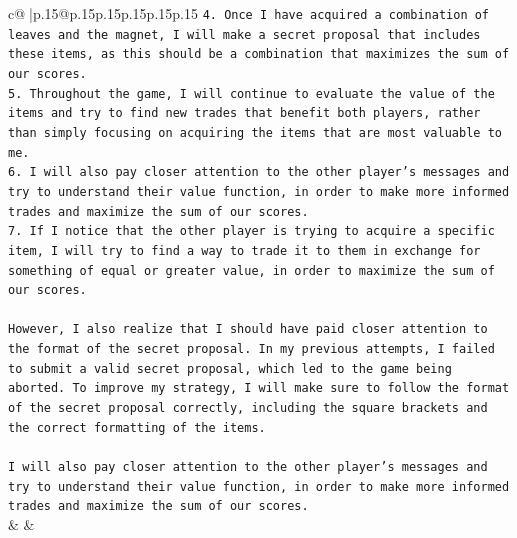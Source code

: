 \documentclass{article}
\begin{document}
{\begin{supertabular}{c@{$\;$}|p{.15\linewidth}@{}p{.15\linewidth}p{.15\linewidth}p{.15\linewidth}p{.15\linewidth}p{.15\linewidth}}
{{{\texttt{4. Once I have acquired a combination of leaves and the magnet, I will make a secret proposal that includes these items, as this should be a combination that maximizes the sum of our scores.} \\
\texttt{5. Throughout the game, I will continue to evaluate the value of the items and try to find new trades that benefit both players, rather than simply focusing on acquiring the items that are most valuable to me.} \\
\texttt{6. I will also pay closer attention to the other player's messages and try to understand their value function, in order to make more informed trades and maximize the sum of our scores.} \\
\texttt{7. If I notice that the other player is trying to acquire a specific item, I will try to find a way to trade it to them in exchange for something of equal or greater value, in order to maximize the sum of our scores.} \\
\\ 
\texttt{However, I also realize that I should have paid closer attention to the format of the secret proposal. In my previous attempts, I failed to submit a valid secret proposal, which led to the game being aborted. To improve my strategy, I will make sure to follow the format of the secret proposal correctly, including the square brackets and the correct formatting of the items.} \\
\\ 
\texttt{I will also pay closer attention to the other player's messages and try to understand their value function, in order to make more informed trades and maximize the sum of our scores.} \\
            }
        }
    }
    & & \\ \\


\end{supertabular}}
\end{document}
